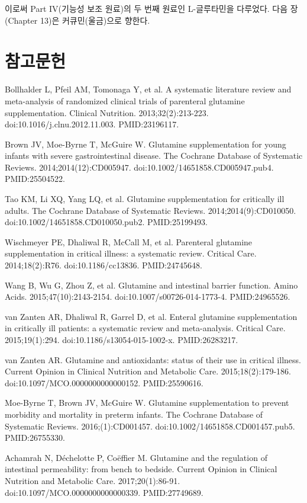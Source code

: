 \documentclass[12pt,oneside]{book}
\newcommand{\refstart}{\par\begingroup\fontsize{8.5pt}{10.2pt}\selectfont\setlength{\parskip}{1.4pt}\raggedright}
\newcommand{\reff}[2]{\par\hangindent=7mm\hangafter=1\noindent[#1]\hspace{2mm}#2\par}
\begin{document}
이로써 Part IV(기능성 보조 원료)의 두 번째 원료인 L-글루타민을 다루었다. 다음 장(Chapter 13)은 커큐민(울금)으로 향한다.

\section*{참고문헌}

\refstart

\reff{1}{Bollhalder L, Pfeil AM, Tomonaga Y, et al. A systematic literature review and meta-analysis of randomized clinical trials of parenteral glutamine supplementation. Clinical Nutrition. 2013;32(2):213-223. doi:10.1016/j.clnu.2012.11.003. PMID:23196117.}

\reff{2}{Brown JV, Moe-Byrne T, McGuire W. Glutamine supplementation for young infants with severe gastrointestinal disease. The Cochrane Database of Systematic Reviews. 2014;2014(12):CD005947. doi:10.1002/14651858.CD005947.pub4. PMID:25504522.}

\reff{3}{Tao KM, Li XQ, Yang LQ, et al. Glutamine supplementation for critically ill adults. The Cochrane Database of Systematic Reviews. 2014;2014(9):CD010050. doi:10.1002/14651858.CD010050.pub2. PMID:25199493.}

\reff{4}{Wischmeyer PE, Dhaliwal R, McCall M, et al. Parenteral glutamine supplementation in critical illness: a systematic review. Critical Care. 2014;18(2):R76. doi:10.1186/cc13836. PMID:24745648.}

\reff{5}{Wang B, Wu G, Zhou Z, et al. Glutamine and intestinal barrier function. Amino Acids. 2015;47(10):2143-2154. doi:10.1007/s00726-014-1773-4. PMID:24965526.}

\reff{6}{van Zanten AR, Dhaliwal R, Garrel D, et al. Enteral glutamine supplementation in critically ill patients: a systematic review and meta-analysis. Critical Care. 2015;19(1):294. doi:10.1186/s13054-015-1002-x. PMID:26283217.}

\reff{7}{van Zanten AR. Glutamine and antioxidants: status of their use in critical illness. Current Opinion in Clinical Nutrition and Metabolic Care. 2015;18(2):179-186. doi:10.1097/MCO.0000000000000152. PMID:25590616.}

\reff{8}{Moe-Byrne T, Brown JV, McGuire W. Glutamine supplementation to prevent morbidity and mortality in preterm infants. The Cochrane Database of Systematic Reviews. 2016;(1):CD001457. doi:10.1002/14651858.CD001457.pub5. PMID:26755330.}

\reff{9}{Achamrah N, Déchelotte P, Coëffier M. Glutamine and the regulation of intestinal permeability: from bench to bedside. Current Opinion in Clinical Nutrition and Metabolic Care. 2017;20(1):86-91. doi:10.1097/MCO.0000000000000339. PMID:27749689.}
\end{document}
